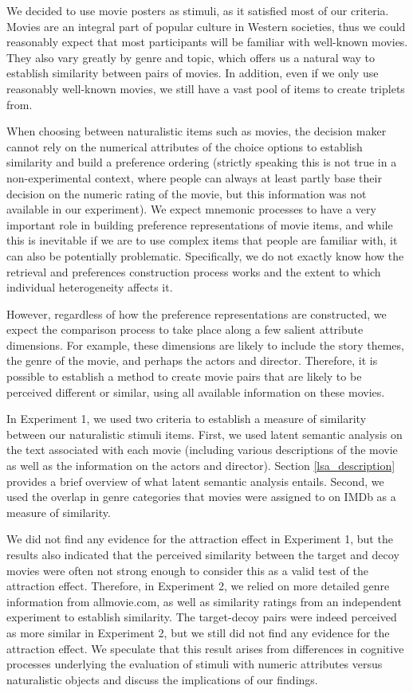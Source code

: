 \documentclass[11pt,a4paper]{article}
\begin{document}
We decided to use movie posters as stimuli, as it satisfied most of our criteria. Movies are an integral part of popular culture in Western societies, thus we could reasonably expect that most participants will be familiar with well-known movies. They also vary greatly by genre and topic, which offers us a natural way to establish similarity between pairs of movies. In addition, even if we only use reasonably well-known movies, we still have a vast pool of items to create triplets from.


When choosing between naturalistic items such as movies, the decision maker cannot rely on the numerical attributes of the choice options to establish similarity and build a preference ordering (strictly speaking this is not true in a non-experimental context, where people can always at least partly base their decision on the numeric rating of the movie, but this information was not available in our experiment). We expect mnemonic processes to have a very important role in building preference representations of movie items, and while this is inevitable if we are to use complex items that people are familiar with, it can also be potentially problematic. Specifically, we do not exactly know how the retrieval and preferences construction process works and the extent to which individual heterogeneity affects it.

However, regardless of how the preference representations are constructed, we expect the comparison process to take place along a few salient attribute dimensions. For example, these dimensions are likely to include the story themes, the genre of the movie, and perhaps the actors and director. Therefore, it is possible to establish a method to create movie pairs that are likely to be perceived different or similar, using all available information on these movies.

In Experiment 1, we used two criteria to establish a measure of similarity between our naturalistic stimuli items. First, we used latent semantic analysis on the text associated with each movie (including various descriptions of the movie as well as the information on the actors and director). Section  \ref{lsa_description} provides a brief overview of what latent semantic analysis entails. Second, we used the overlap in genre categories that movies were assigned to on IMDb as a measure of similarity. 

We did not find any evidence for the attraction effect in Experiment 1, but the results also indicated that the perceived similarity between the target and decoy movies were often not strong enough to consider this as a valid test of the attraction effect. Therefore, in Experiment 2, we relied on more detailed genre information from allmovie.com, as well as similarity ratings from an independent experiment to establish similarity. The target-decoy pairs were indeed perceived as more similar in Experiment 2, but we still did not find any evidence for the attraction effect. We speculate that this result arises from differences in cognitive processes underlying the evaluation of stimuli with numeric attributes versus naturalistic objects and discuss the implications of our findings.
\end{document}
